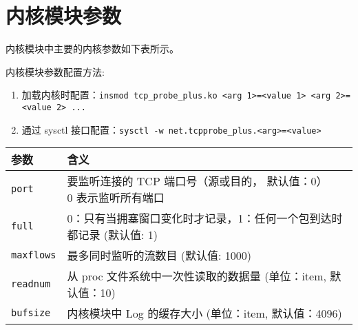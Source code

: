 \documentclass{article}
\begin{document}
	\section{内核模块参数}
	内核模块中主要的内核参数如下表所示。
	\par 内核模块参数配置方法:
	\begin{enumerate}
		\item 加载内核时配置：\texttt{insmod tcp\_probe\_plus.ko <arg 1>=<value 1> <arg 2>=<value 2> ...}
		\item 通过 sysctl 接口配置：\texttt{sysctl -w net.tcpprobe\_plus.<arg>=<value>}
	\end{enumerate}
	\begin{table}[!ht]
		\centering
		\begin{tabular}{|l|l|} \hline
			{\bf 参数}		& {\bf 含义} \\ \hline
			\texttt{port}		& \parbox{0.6\linewidth}{								
										要监听连接的 TCP 端口号（源或目的， 默认值：0） \\
										0 表示监听所有端口
									} \\ \hline
			\texttt{full}		& 0：只有当拥塞窗口变化时才记录，1：任何一个包到达时都记录 (默认值: 1) \\ \hline
			\texttt{maxflows}	& 最多同时监听的流数目 (默认值: 1000) \\ \hline
			\texttt{readnum}	& 从 proc 文件系统中一次性读取的数据量 (单位：item, 默认值：10) \\ \hline
			\texttt{bufsize}	& 内核模块中 Log 的缓存大小 (单位：item, 默认值：4096) \\ \hline
		\end{tabular}
	\end{table}
\end{document}
